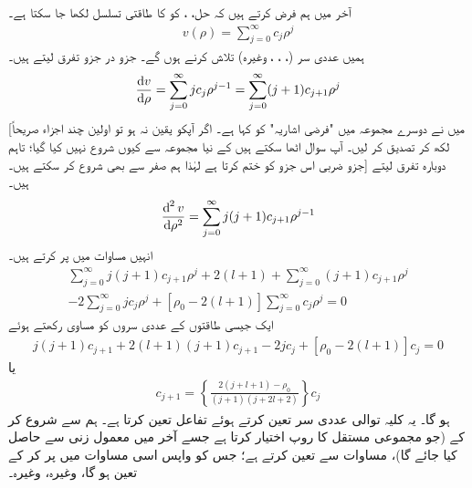   آخر میں ہم فرض کرتے ہیں کہ حل،   ،  کو  کا طاقتی تسلسل لکھا جا سکتا ہے۔
  \begin{align}
v(\rho)=\sum_{j=0}^{\infty}c_{j}\rho^{j} 
\end{align}
ہمیں عددی سر (، ، ، وغیرہ) تلاش کرنے ہوں گے۔  جزو در جزو تفرق لیتے ہیں۔
\begin{align*}
\frac{\dif{v}}{\dif{\rho}}=\sum_{j=0}^{\infty}jc_{j}\rho^{j-1}=\sum_{j=0}^{\infty}(j+1)c_{j+1}\rho^{j} 
\end{align*}
[میں نے دوسرے مجموعہ میں "فرضی اشاریہ"  کو  کہا ہے۔ اگر آپکو یقین نہ  ہو تو اولین چند اجزاء صریحاً لکھ کر تصدیق کر لیں۔ آپ سوال اٹھا سکتے ہیں کے نیا مجموعہ   سے کیوں  شروع نہیں کیا گیا؛ تاہم جزو ضربی   اس جزو کو ختم کرتا ہے لہٰذا ہم صفر سے بھی شروع کر سکتے ہیں۔] دوبارہ تفرق لیتے ہیں۔
\begin{align*}
\frac{\dif^{\,2}{v}}{\dif{\rho^{2}}}=\sum_{j=0}^{\infty}j(j+1)c_{j+1}\rho^{j-1} 
\end{align*}
انہیں مساوات  میں پر کرتے ہیں۔
\begin{multline*}
\sum_{j=0}^{\infty}j(j+1)c_{j+1}\rho^{j}+2(l+1)+\sum_{j=0}^{\infty}(j+1)c_{j+1}\rho^{j} \\
-2\sum_{j=0}^{\infty}jc_{j}\rho^{j}+[\rho_{0}-2(l+1)]\sum_{j=0}^{\infty}c_{j}\rho^{j}=0 
\end{multline*}
ایک جیسی طاقتوں کے عددی سروں کو مساوی رکھتے ہوئے
\begin{align*}
j(j+1)c_{j+1}+2(l+1)(j+1)c_{j+1}-2jc_{j}+[\rho_{0}-2(l+1)]c_{j}=0 
\end{align*}
یا
\begin{align}\label{مساوات_ابعادی_کولمب_کلیہ_توالی}
c_{j+1}=\left\{\frac{2(j+l+1)-\rho_{0}}{(j+1)(j+2l+2)}\right\}c_{j} 
\end{align}
ہو گا۔ یہ کلیہ توالی عددی سر تعین کرتے ہوئے تفاعل  تعین کرتا ہے۔ ہم  سے شروع کر کے (جو مجموعی مستقل کا روپ اختیار کرتا ہے جسے آخر میں معمول زنی سے حاصل کیا جائے گا)، مساوات   سے  تعین کرتے ہے؛ جس کو واپس اسی مساوات میں پر کر کے  تعین ہو گا، وغیرہ، وغیرہ۔

